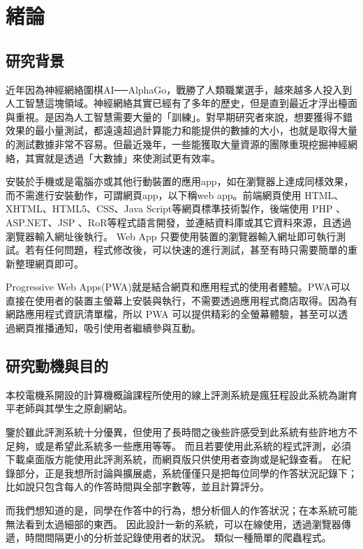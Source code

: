 \chapter{緒論}
\section{研究背景} 

近年因為神經網絡圍棋AI──AlphaGo，戰勝了人類職業選手，越來越多人投入到人工智慧這塊領域。神經網絡其實已經有了多年的歷史，但是直到最近才浮出檯面與重視。是因為人工智慧需要大量的「訓練」。對早期研究者來說，想要獲得不錯效果的最小量測試，都遠遠超過計算能力和能提供的數據的大小，也就是取得大量的測試數據非常不容易。但最近幾年，一些能獲取大量資源的團隊重現挖掘神經網絡，其實就是透過「大數據」來使測試更有效率。\cite{name1}

安裝於手機或是電腦亦或其他行動裝置的應用app，如在瀏覽器上達成同樣效果，而不需進行安裝動作，可謂網頁app，以下稱web app。前端網頁使用 HTML、XHTML、HTML5、CSS、Java Script等網頁標準技術製作，後端使用 PHP 、 ASP.NET、JSP 、RoR等程式語言開發，並連結資料庫或其它資料來源，且透過瀏覽器輸入網址後執行。 Web App 只要使用裝置的瀏覽器輸入網址即可執行測試。若有任何問題，程式修改後，可以快速的進行測試，甚至有時只需要簡單的重新整理網頁即可。\cite{name2}

Progressive Web Apps(PWA)就是結合網頁和應用程式的使用者體驗。PWA可以直接在使用者的裝置主螢幕上安裝與執行，不需要透過應用程式商店取得。因為有網路應用程式資訊清單檔，所以 PWA 可以提供精彩的全螢幕體驗，甚至可以透過網頁推播通知，吸引使用者繼續參與互動。\cite{name3}


\section{研究動機與目的}

本校電機系開設的計算機概論課程所使用的線上評測系統是瘋狂程設\cite{name4}此系統為謝育平老師與其學生之原創網站。\cite{name5}

鑒於雖此評測系統十分優異，但使用了長時間之後些許感受到此系統有些許地方不足夠，或是希望此系統多一些應用等等。
而且若要使用此系統的程式評測，必須下載桌面版方能使用此評測系統，而網頁版只供使用者查詢或是紀錄查看。
在紀錄部分，正是我想所討論與擴展處，系統僅僅只是把每位同學的作答狀況記錄下；比如說只包含每人的作答時間與全部字數等，並且計算評分。

而我們想知道的是，同學在作答中的行為，想分析個人的作答狀況；在本系統可能無法看到太過細部的東西。
因此設計一新的系統，可以在線使用，透過瀏覽器傳遞，時間間隔更小的分析並記錄使用者的狀況。
類似一種簡單的爬蟲程式。\cite{name6}

